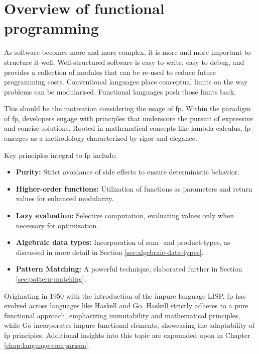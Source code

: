     \chapter{Overview of functional programming}\label{chap:functional-programming}
    \begin{shaded}
        \noindent
        \glqq{}As software becomes more and more complex, it is more and more important to structure it well. Well-structured software is easy to write, easy to debug, and provides a collection of modules that can be re-used to reduce future programming costs. Conventional languages place conceptual limits on the way problems can be modularised. Functional languages push those limits back.\grqq{} \cite{Hughes1989}
    \end{shaded}
    This should be the motivation considering the usage of \ac{fp}.
    Within the paradigm of \ac{fp}, developers engage with principles that underscore the pursuit of expressive and concise solutions. Rooted in mathematical concepts like lambda calculus, \ac{fp} emerges as a methodology characterized by rigor and elegance.
    
    Key principles integral to \ac{fp} include:
    
    \begin{itemize}
        \item \textbf{Purity:} Strict avoidance of side effects to ensure deterministic behavior.
        \item \textbf{Higher-order functions:} Utilization of functions as parameters and return values for enhanced modularity.
        \item \textbf{Lazy evaluation:} Selective computation, evaluating values only when necessary for optimization.
        \item \textbf{Algebraic data types:} Incorporation of sum- and product-types, as discussed in more detail in Section \ref{sec:algebraic-data-types}.
        \item \textbf{Pattern Matching:} A powerful technique, elaborated further in Section \ref{sec:pattern-matching}.
    \end{itemize}
    
    Originating in 1950 with the introduction of the impure language LISP, \ac{fp} has evolved across languages like Haskell and Go. Haskell strictly adheres to a pure functional approach, emphasizing immutability and mathematical principles, while Go incorporates impure functional elements, showcasing the adaptability of \ac{fp} principles. Additional insights into this topic are expounded upon in Chapter \ref{chap:language-comparison}.
    
